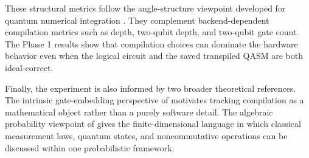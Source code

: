 These structural metrics follow the angle-structure viewpoint developed for
quantum numerical integration \cite{chinesta2026encoding}. They complement
backend-dependent compilation metrics such as depth, two-qubit depth, and
two-qubit gate count. The Phase 1 results show that compilation choices can
dominate the hardware behavior even when the logical circuit and the saved
transpiled QASM are both ideal-correct.

Finally, the experiment is also informed by two broader theoretical references.
The intrinsic gate-embedding perspective of \cite{falco2026liegates} motivates
tracking compilation as a mathematical object rather than a purely software
detail. The algebraic probability viewpoint of
\cite{falco2026algebraicprobability} gives the finite-dimensional language in
which classical measurement laws, quantum states, and noncommutative operations
can be discussed within one probabilistic framework.
